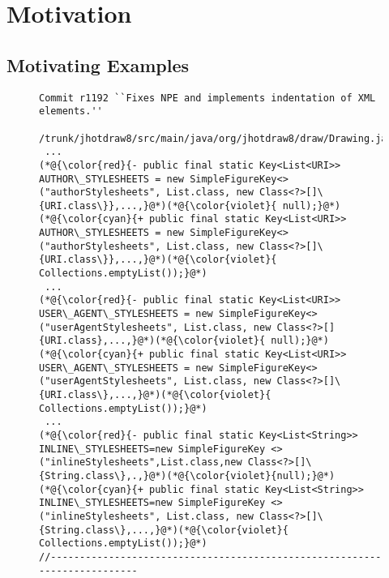 \section{Motivation}
\label{motiv:sec}

\subsection{Motivating Examples}
\label{exe:sec}

\begin{figure}[t]
	\centering
	\begin{lstlisting}[]
Commit r1192 ``Fixes NPE and implements indentation of XML elements.''
 /trunk/jhotdraw8/src/main/java/org/jhotdraw8/draw/Drawing.java
 ...
(*@{\color{red}{- public final static Key<List<URI>> AUTHOR\_STYLESHEETS = new SimpleFigureKey<> ("authorStylesheets", List.class, new Class<?>[]\{URI.class\}},...,}@*)(*@{\color{violet}{ null);}@*)
(*@{\color{cyan}{+ public final static Key<List<URI>> AUTHOR\_STYLESHEETS = new SimpleFigureKey<> ("authorStylesheets", List.class, new Class<?>[]\{URI.class\}},...,}@*)(*@{\color{violet}{ Collections.emptyList());}@*)
 ...
(*@{\color{red}{- public final static Key<List<URI>> USER\_AGENT\_STYLESHEETS = new SimpleFigureKey<>("userAgentStylesheets", List.class, new Class<?>[]{URI.class},...,}@*)(*@{\color{violet}{ null);}@*)
(*@{\color{cyan}{+ public final static Key<List<URI>> USER\_AGENT\_STYLESHEETS = new SimpleFigureKey<> ("userAgentStylesheets", List.class, new Class<?>[]\{URI.class\},...,}@*)(*@{\color{violet}{ Collections.emptyList());}@*)
 ...
(*@{\color{red}{- public final static Key<List<String>> INLINE\_STYLESHEETS=new SimpleFigureKey <>("inlineStylesheets",List.class,new Class<?>[]\{String.class\},.,}@*)(*@{\color{violet}{null);}@*)
(*@{\color{cyan}{+ public final static Key<List<String>> INLINE\_STYLESHEETS=new SimpleFigureKey <>("inlineStylesheets", List.class, new Class<?>[]\{String.class\},...,}@*)(*@{\color{violet}{ Collections.emptyList());}@*)
//--------------------------------------------------------------------------

\end{lstlisting}
\end{figure}
